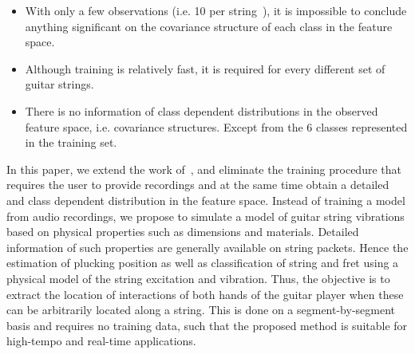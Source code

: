 \documentclass{article}
\begin{document}
\begin{sloppy}
\begin{itemize}
    \item With only a few observations (i.e. 10 per string~\cite{hjerrild::icassp19}), it is impossible to conclude anything significant on the covariance structure of each class in the feature space.
    \item Although training is relatively fast, it is required for every different set of guitar strings.
        \item There is no information of class dependent distributions in the observed feature space, i.e. covariance structures. Except from the 6 classes represented in the training set.
\end{itemize}%
In this paper, we extend the work of~\cite{hjerrild::icassp19}, and eliminate the training procedure that requires the user to provide recordings and at the same time obtain a detailed and class dependent distribution in the feature space. Instead of training a model from audio recordings, we propose to simulate a model of guitar string vibrations based on physical properties such as dimensions and materials. Detailed information of such properties are generally available on string packets. Hence the estimation of plucking position as well as classification of string and fret using a physical model of the string excitation and vibration. Thus, the objective is to extract the location of interactions of both hands of the guitar player when these can be arbitrarily located along a string. This is done on a segment-by-segment basis and requires no training data, such that the proposed method is suitable for high-tempo and real-time applications. 

\end{sloppy}
\end{document}
